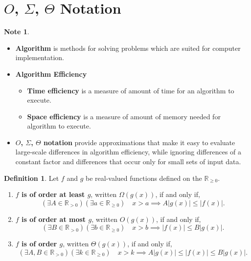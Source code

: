 \documentclass[12pt,openany]{book}
\theoremstyle{definition}
\newtheorem{definition}{Definition}[chapter]
\newtheorem*{note}{Note}
\newcommand{\R}{\mathbb{R}}
\renewcommand{\abs}[1]{\left\lvert #1 \right\rvert}
\begin{document}
	\section{$O$, $\Sigma$, $\Theta$ Notation}
	
	\begin{note}
		\ \begin{itemize}
			\item \textbf{Algorithm} is methods for solving problems which are suited for computer implementation.
			\item \textbf{Algorithm Efficiency}
			\begin{itemize}
				\item \textbf{Time efficiency} is a measure of amount of time for an algorithm to execute.
				\item \textbf{Space efficiency} is a measure of amount of memory needed for algorithm to execute.
			\end{itemize}
			\item \textbf{$O$, $\Sigma$, $\Theta$ notation} provide approximations that make it easy to evaluate large-scale differences in algorithm efficiency, while ignoring differences of a constant factor and differences that occur only for small sets of input data.
		\end{itemize}
	\end{note}
	\vspace{20pt}
	\begin{tcolorbox}[colframe=defcolor,title={\color{white}\bf $\Omega$, \(O\) and $\Theta$}]
		\begin{definition}
			Let \(f\) and \(g\) be real-valued functions defined on the \(\R_{\geq 0}\).
			\begin{enumerate}[(1)]
				\item \textbf{$f$ is of order at least $g$}, written \(\Omega(g(x))\), if and only if, \[
				(\exists A\in\R_{> 0})(\exists a\in\R_{\geq 0})\quad x>a\implies A\abs{g(x)}\leq\abs{f(x)}.
				\]
				\item \textbf{$f$ is of order at most $g$}, written \(O(g(x))\), if and only if, \[
				(\exists B\in\R_{> 0})(\exists b\in\R_{\geq 0})\quad x>b\implies \abs{f(x)}\leq B\abs{g(x)}.
				\]
				\item \textbf{$f$ is of order $g$}, written \(\Theta(g(x))\), if and only if, \[
				(\exists A,B\in\R_{> 0})(\exists k\in\R_{\geq 0})\quad x>k\implies A\abs{g(x)}\leq\abs{f(x)}\leq B\abs{g(x)}.
				\]
			\end{enumerate}
		\end{definition}
	\end{tcolorbox}
\end{document}
